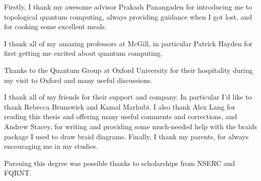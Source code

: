 Firstly, I thank my awesome advisor Prakash Panangaden for introducing me to
topological quantum computing, always providing guidance when I got lost, and
for cooking some excellent meals.

I thank all of my amazing professors at McGill, in particular Patrick
Hayden for first getting me excited about quantum computing.  

Thanks to the Quantum Group at Oxford University for their hospitality during
my visit to Oxford and many useful discussions.

I thank all of my friends for their support and company. In particular I'd like
to thank Rebecca Brunswick and Kamal Marhubi. I also thank Alex Lang for
reading this thesis and offering many useful comments and corrections, and
Andrew Stacey, for writing and providing some much-needed help with the braids
package I used to draw braid diagrams.  Finally, I thank my parents, for always
encouraging me in my studies. 


Pursuing this degree was possible thanks to scholarships from NSERC and FQRNT.
